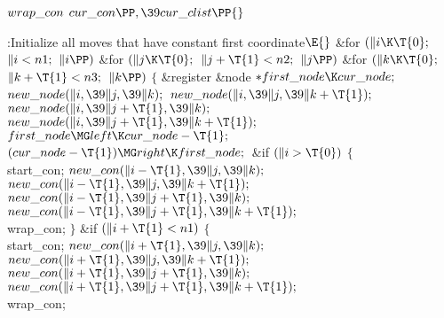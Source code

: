 \B\4\D$\\{wrap\_con}$ \5
$\\{cur\_con}\PP,\39\\{cur\_clist}\PP{}$%
\par
\Y\B\4:Initialize all moves that have constant first coordinate\X${}\E{}$\6
\&{for} ${}(\|i\K\T{0};{}$ ${}\|i<\\{n1};{}$ ${}\|i\PP){}$\1\6
\&{for} ${}(\|j\K\T{0};{}$ ${}\|j+\T{1}<\\{n2};{}$ ${}\|j\PP){}$\1\6
\&{for} ${}(\|k\K\T{0};{}$ ${}\|k+\T{1}<\\{n3};{}$ ${}\|k\PP){}$\5
${}\{{}$\1\6
\&{register} \&{node} ${}{*}\\{first\_node}\K\\{cur\_node};{}$\7
${}\\{new\_node}(\|i,\39\|j,\39\|k);{}$\6
${}\\{new\_node}(\|i,\39\|j,\39\|k+\T{1});{}$\6
${}\\{new\_node}(\|i,\39\|j+\T{1},\39\|k);{}$\6
${}\\{new\_node}(\|i,\39\|j+\T{1},\39\|k+\T{1});{}$\6
${}\\{first\_node}\MG\\{left}\K\\{cur\_node}-\T{1};{}$\6
${}(\\{cur\_node}-\T{1})\MG\\{right}\K\\{first\_node};{}$\6
\&{if} ${}(\|i>\T{0}){}$\5
${}\{{}$\1\6
\\{start\_con};\6
${}\\{new\_con}(\|i-\T{1},\39\|j,\39\|k);{}$\6
${}\\{new\_con}(\|i-\T{1},\39\|j,\39\|k+\T{1});{}$\6
${}\\{new\_con}(\|i-\T{1},\39\|j+\T{1},\39\|k);{}$\6
${}\\{new\_con}(\|i-\T{1},\39\|j+\T{1},\39\|k+\T{1});{}$\6
\\{wrap\_con};\6
\4${}\}{}$\2\6
\&{if} ${}(\|i+\T{1}<\\{n1}){}$\5
${}\{{}$\1\6
\\{start\_con};\6
${}\\{new\_con}(\|i+\T{1},\39\|j,\39\|k);{}$\6
${}\\{new\_con}(\|i+\T{1},\39\|j,\39\|k+\T{1});{}$\6
${}\\{new\_con}(\|i+\T{1},\39\|j+\T{1},\39\|k);{}$\6
${}\\{new\_con}(\|i+\T{1},\39\|j+\T{1},\39\|k+\T{1});{}$\6
\\{wrap\_con};\6
